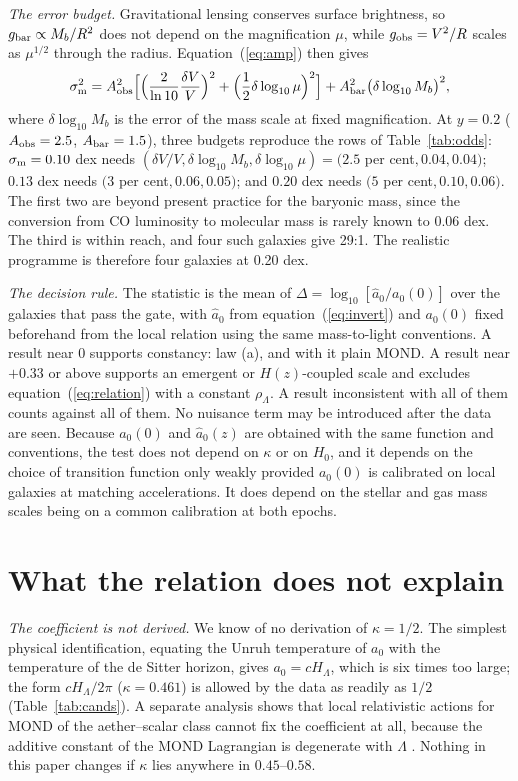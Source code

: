 \documentclass[fleqn,usenatbib]{mnras}
\begin{document}
\emph{The error budget.} Gravitational lensing conserves surface brightness, so $g_{\rm bar}\propto M_b/R^2$ does not depend on the magnification $\mu$, while $g_{\rm obs}=V^2/R$ scales as $\mu^{1/2}$ through the radius. Equation~(\ref{eq:amp}) then gives
\begin{equation}
\sigma_{\rm m}^2=A_{\rm obs}^2\Big[\Big(\frac{2}{\ln10}\frac{\delta V}{V}\Big)^2+\Big(\frac12\delta\log_{10}\mu\Big)^2\Big]+A_{\rm bar}^2\big(\delta\log_{10}M_b\big)^2 ,
\end{equation}
where $\delta\log_{10}M_b$ is the error of the mass scale at fixed magnification. At $y=0.2$ ($A_{\rm obs}=2.5$, $A_{\rm bar}=1.5$), three budgets reproduce the rows of Table~\ref{tab:odds}: $\sigma_{\rm m}=0.10$ dex needs $(\delta V/V,\delta\log_{10}M_b,\delta\log_{10}\mu)=(2.5$ per cent$,0.04,0.04)$; $0.13$ dex needs $(3$ per cent$,0.06,0.05)$; and $0.20$ dex needs $(5$ per cent$,0.10,0.06)$. The first two are beyond present practice for the baryonic mass, since the conversion from CO luminosity to molecular mass is rarely known to 0.06 dex. The third is within reach, and four such galaxies give 29:1. The realistic programme is therefore four galaxies at 0.20 dex.

\emph{The decision rule.} The statistic is the mean of $\Delta=\log_{10}[\hat a_0/a_0(0)]$ over the galaxies that pass the gate, with $\hat a_0$ from equation~(\ref{eq:invert}) and $a_0(0)$ fixed beforehand from the local relation using the same mass-to-light conventions. A result near $0$ supports constancy: law (a), and with it plain MOND. A result near $+0.33$ or above supports an emergent or $H(z)$-coupled scale and excludes equation~(\ref{eq:relation}) with a constant $\rho_\Lambda$. A result inconsistent with all of them counts against all of them. No nuisance term may be introduced after the data are seen. Because $a_0(0)$ and $\hat a_0(z)$ are obtained with the same function and conventions, the test does not depend on $\kappa$ or on $H_0$, and it depends on the choice of transition function only weakly provided $a_0(0)$ is calibrated on local galaxies at matching accelerations. It does depend on the stellar and gas mass scales being on a common calibration at both epochs.

\section{What the relation does not explain}
\label{sec:limits}
\emph{The coefficient is not derived.} We know of no derivation of $\kappa=1/2$. The simplest physical identification, equating the Unruh temperature of $a_0$ with the temperature of the de Sitter horizon, gives $a_0=cH_\Lambda$, which is six times too large; the form $cH_\Lambda/2\pi$ ($\kappa=0.461$) is allowed by the data as readily as $1/2$ (Table~\ref{tab:cands}). A separate analysis shows that local relativistic actions for MOND of the aether--scalar class cannot fix the coefficient at all, because the additive constant of the MOND Lagrangian is degenerate with $\Lambda$ \citep{Zimmerman2026kappa}. Nothing in this paper changes if $\kappa$ lies anywhere in $0.45$--$0.58$.
\end{document}
